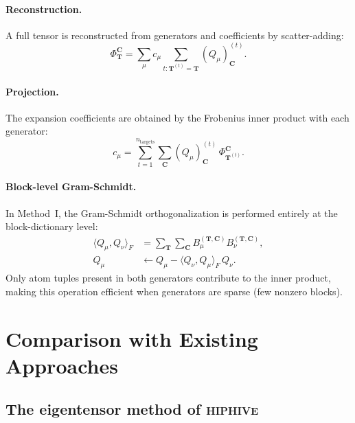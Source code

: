 \documentclass[twocolumn,amsmath,amssymb,aps,prb,10pt,floatfix]{revtex4-2}
\newcommand{\vT}{\mathbf{T}}
\newcommand{\vC}{\mathbf{C}}
\begin{document}
\paragraph{Reconstruction.}
A full tensor is reconstructed from generators and coefficients by scatter-adding:
\begin{equation}
\Phi_{\vT}^{\vC}
= \sum_{\mu} c_\mu \sum_{t : \vT^{(t)} = \vT}
  (Q_\mu)^{(t)}_{\vC}.
\label{eq:reconstruction}
\end{equation}

\paragraph{Projection.}
The expansion coefficients are obtained by the Frobenius inner product with each generator:
\begin{equation}
c_\mu = \sum_{t=1}^{n_{\mathrm{targets}}}
  \sum_{\vC} (Q_\mu)^{(t)}_{\vC} \, \Phi_{\vT^{(t)}}^{\vC}.
\label{eq:projection}
\end{equation}

\paragraph{Block-level Gram-Schmidt.}
In Method~I, the Gram-Schmidt orthogonalization is performed entirely at the block-dictionary level:
\begin{align}
\langle Q_\mu, Q_\nu \rangle_F &= \sum_{\vT} \sum_{\vC} B_\mu^{(\vT,\vC)} B_\nu^{(\vT,\vC)}, \label{eq:block_dot} \\
Q_\mu &\gets Q_\mu - \langle Q_\nu, Q_\mu \rangle_F \, Q_\nu. \label{eq:block_gs}
\end{align}
Only atom tuples present in both generators contribute to the inner product, making this operation efficient when generators are sparse (few nonzero blocks).


\section{Comparison with Existing Approaches}
\label{sec:comparison}

\subsection{The eigentensor method of \textsc{hiphive}}
\end{document}
